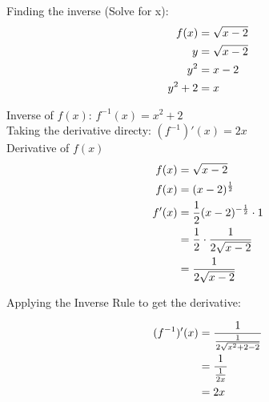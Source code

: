 \documentclass[a4paper]{article}
\begin{document}
\begin{enumerate}
\begin{enumerate}
	
	
Finding the inverse (Solve for x):\\

\begin{align*}
	f(x) &= \sqrt{x - 2}\notag\\
	y &= \sqrt{x - 2}\notag\\
	y^2 &= x - 2\notag\\
	y^2 + 2 &= x\notag
\end{align*}		

Inverse of $f(x)$: $f^{-1}(x) = x^2 + 2$\\
Taking the derivative directy: $(f^{-1})'(x) = 2x$\\

Derivative of $f(x)$\\	
	
\begin{align*}
	f(x) &= \sqrt{x - 2}\notag\\
	f(x) &= (x-2)^\frac{1}{2}\notag\\
	f'(x) &= \frac{1}{2}(x-2)^{-\frac{1}{2}} \cdot 1\notag\\
	&= \frac{1}{2} \cdot \frac{1}{2 \sqrt{x-2}}\notag\\
	&= \frac{1}{2\sqrt{x-2}}\notag
\end{align*}	
	
Applying the Inverse Rule to get the derivative:

\begin{align*}
	(f^{-1})'(x) &= \frac{1}{\frac{1}{2\sqrt{x^2 + 2 - 2}}}\notag\\
	&= \frac{1}{\frac{1}{2x}}\notag\\
	&= 2x\notag
\end{align*}
	
\end{enumerate}


\end{enumerate}
\end{document}
